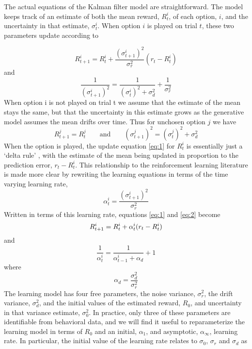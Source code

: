 \documentclass[12pt]{article}
\begin{document}
The actual equations of the Kalman filter model are straightforward. The model keeps track of an estimate of both the mean reward, $R^i_t$, of each option, $i$, and the uncertainty in that estimate, $\sigma^i_t$.  When option $i$ is played on trial $t$, these two parameters update according to

\begin{equation}
\label{eq:1}
	R^i_{t+1} = R^i_t + \frac{(\sigma^{i}_{t+1})^2}{\sigma_r^2} (r_t - R^i_t)
\end{equation}
and
\begin{equation}
\label{eq:2}
	\frac{1}{(\sigma^i_{t+1})^2} = \frac{1}{(\sigma^i_t)^2 + \sigma_d^2} + \frac{1}{\sigma_r^2}
\end{equation}
When option i is not played on trial t we assume that the estimate of the mean stays the same, but that the uncertainty in this estimate grows as the generative model assumes the mean drifts over time.  Thus for unchosen option $j$ we have
\begin{equation}
R^j_{t+1} = R^j_t \quad \quad \mbox{and} \quad \quad (\sigma^j_{t+1})^2 = (\sigma^j_{t})^2 + \sigma_d^2
\end{equation}
When the option is played, the update equation \ref{eq:1} for $R^i_t$ is essentially just a `delta rule' \cite{rescorla1972theory,Schultz1997-oz}, with the estimate of the mean being updated in proportion to the prediction error, $r_t - R^i_t$.  This relationship to the reinforcement learning literature is made more clear by rewriting the learning equations in terms of the time varying learning rate, 
\begin{equation}
	\alpha^i_{t} = \frac{(\sigma^i_{t+1})^2}{\sigma_r^2 }
\end{equation}
Written in terms of this learning rate, equations \ref{eq:1} and \ref{eq:2} become
\begin{equation}
	R^i_{t+1} = R^i_t + \alpha^i_{t} (r_t - R^i_t) \\
\end{equation}
and
\begin{equation}
	\frac{1}{\alpha^i_{t}} = \frac{1}{\alpha^i_{t-1} + \alpha_d} + 1
\end{equation}
where 
\begin{equation}
	\alpha_{d} = \frac{\sigma_{d}^2}{\sigma_r^2}
\end{equation}
The learning model has four free parameters, the noise variance, $\sigma_r^2$, the drift variance, $\sigma_d^2$, and the initial values of the estimated reward, $R_0$, and uncertainty in that variance estimate, $\sigma_0^2$.  In practice, only three of these parameters are identifiable from behavioral data, and we will find it useful to reparameterize the learning model in terms of $R_0$ and an initial, $\alpha_1$, and asymptotic, $\alpha_{\infty}$, learning rate.  In particular, the initial value of the learning rate relates to $\sigma_0$, $\sigma_r$ and $\sigma_d$ as
\end{document}

